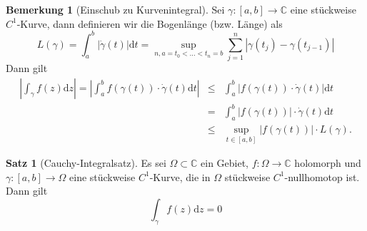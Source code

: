 \documentclass[11pt,titlepage]{article}
\theoremstyle{definition}
\newtheorem{theorem}{Satz}[section]
\newtheorem{remark}{Bemerkung}
\theoremstyle{remark}
\begin{document}
	\begin{remark}[Einschub zu Kurvenintegral]
		Sei $\gamma:[a,b]\to\mathbb{C}$ eine stückweise $C^1$-Kurve, dann definieren wir die 
		Bogenlänge (bzw. Länge) als
		\[ L(\gamma)=\int_a^b |\dot{\gamma}(t)|\mathrm{d}t =\sup_{n,a=t_0 <\ldots <t_n =b} 
		\sum_{j=1}^n |\gamma(t_j)-\gamma(t_{j-1})| \]
		Dann gilt
		\begin{eqnarray*}
			\left|\int_{\gamma} f(z)\mathrm{d}z \right| = \left|\int_a^b f(\gamma(t))\cdot 
			\dot{\gamma}(t)\mathrm{d}t \right| 
			&\leq& \int_a^b |f(\gamma(t))\cdot \dot{\gamma}(t) |\mathrm{d}t \\
			&=& \int_a^b |f(\gamma(t))|\cdot \dot{\gamma}(t)\mathrm{d}t \\
			&\leq& \sup_{t\in [a,b]} |f(\gamma(t))| \cdot L(\gamma).
		\end{eqnarray*}
	\end{remark}
	
	\begin{theorem}[Cauchy-Integralsatz]
		Es sei $\Omega\subset\mathbb{C}$ ein Gebiet, $f:\Omega\to\mathbb{C}$ holomorph und 
		$\gamma:[a,b]\to\Omega$ eine stückweise $C^1$-Kurve, die in $\Omega$ stückweise 
		$C^1$-nullhomotop ist. Dann gilt 
		\[ \int_{\gamma} f(z) \mathrm{d}z =0 \]
	\end{theorem}
	
\end{document}
